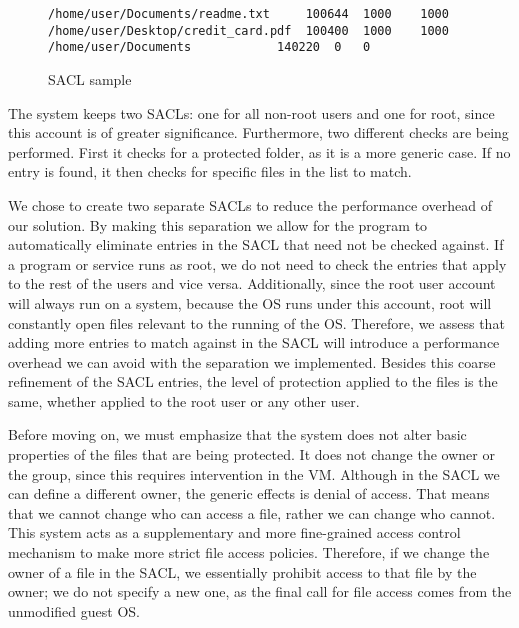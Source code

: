 \begin{figure}[ht]
	\centering
	\begin{lstlisting}
/home/user/Documents/readme.txt		100644	1000	1000
/home/user/Desktop/credit_card.pdf	100400	1000	1000
/home/user/Documents			140220	0	0
	\end{lstlisting}
	\caption{\ac{SACL} sample}
	\label{fig:sacl}
\end{figure}

\par The system keeps two \acp{SACL}: one for all non-root users and one for root, since this account is of greater significance. Furthermore, two different checks are being performed. First it checks for a protected folder, as it is a more generic case. If no entry is found, it then checks for specific files in the list to match. 

\par We chose to create two separate \acp{SACL} to reduce the performance overhead of our solution. By making this separation we allow for the program to automatically eliminate entries in the \ac{SACL} that need not be checked against. If a program or service runs as root, we do not need to check the entries that apply to the rest of the users and vice versa. Additionally, since the root user account will always run on a system, because the \ac{OS} runs under this account, root will constantly open files relevant to the running of the \ac{OS}. Therefore, we assess that adding more entries to match against in the \ac{SACL} will introduce a performance overhead we can avoid with the separation we implemented. Besides this coarse refinement of the \ac{SACL} entries, the level of protection applied to the files is the same, whether applied to the root user or any other user.

\par Before moving on, we must emphasize that the system does not alter basic properties of the files that are being protected. It does not change the owner or the group, since this requires intervention in the \ac{VM}. Although in the \ac{SACL} we can define a different owner, the generic effects is denial of access. That means that we cannot change who can access a file, rather we can change who cannot. This system acts as a supplementary and more fine-grained access control mechanism to make more strict file access policies. Therefore, if we change the owner of a file in the \ac{SACL}, we essentially prohibit access to that file by the owner; we do not specify a new one, as the final call for file access comes from the unmodified guest \ac{OS}.


